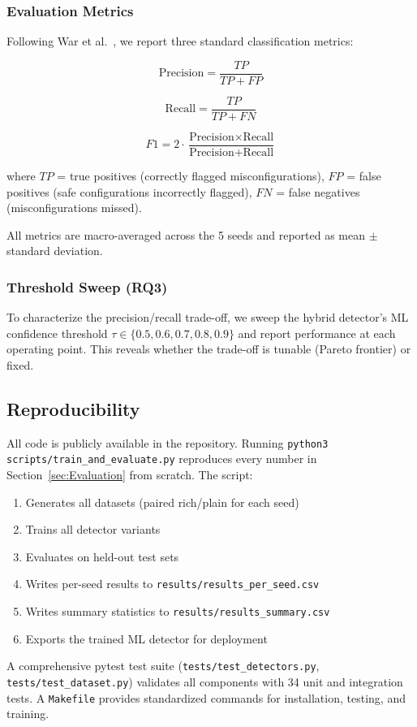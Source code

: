 \subsubsection{Evaluation Metrics}

Following War et al.~\cite{War25}, we report three standard classification metrics:

\begin{equation}
\text{Precision} = \frac{TP}{TP + FP}
\end{equation}

\begin{equation}
\text{Recall} = \frac{TP}{TP + FN}
\end{equation}

\begin{equation}
F1 = 2 \cdot \frac{\text{Precision} \times \text{Recall}}{\text{Precision} + \text{Recall}}
\end{equation}

where $TP$ = true positives (correctly flagged misconfigurations), $FP$ = false positives (safe configurations incorrectly flagged), $FN$ = false negatives (misconfigurations missed).

All metrics are macro-averaged across the 5 seeds and reported as mean $\pm$ standard deviation.

\subsubsection{Threshold Sweep (RQ3)}

To characterize the precision/recall trade-off, we sweep the hybrid detector's ML confidence threshold $\tau \in \{0.5, 0.6, 0.7, 0.8, 0.9\}$ and report performance at each operating point. This reveals whether the trade-off is tunable (Pareto frontier) or fixed.

\subsection{Reproducibility}

All code is publicly available in the repository. Running \texttt{python3 scripts/train\_and\_evaluate.py} reproduces every number in Section~\ref{sec:Evaluation} from scratch. The script:
\begin{enumerate}
  \item Generates all datasets (paired rich/plain for each seed)
  \item Trains all detector variants
  \item Evaluates on held-out test sets
  \item Writes per-seed results to \texttt{results/results\_per\_seed.csv}
  \item Writes summary statistics to \texttt{results/results\_summary.csv}
  \item Exports the trained ML detector for deployment
\end{enumerate}

A comprehensive pytest test suite (\texttt{tests/test\_detectors.py}, \texttt{tests/test\_dataset.py}) validates all components with 34 unit and integration tests. A \texttt{Makefile} provides standardized commands for installation, testing, and training.

